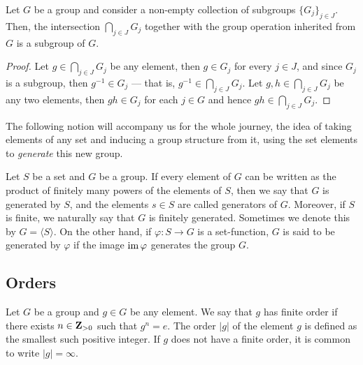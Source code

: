 \begin{corollary}
    \label{cor:intersection-subgroups}
    Let \(G\) be a group and consider a non-empty collection of subgroups
    \(\{G_{j}\}_{j \in J}\). Then, the intersection \(\bigcap_{j \in J} G_j\) together with
    the group operation inherited from \(G\) is a subgroup of \(G\).
\end{corollary}

\begin{proof}
    Let \(g \in \bigcap_{j \in J} G_j\) be any element, then \(g \in G_j\) for every
    \(j \in J\), and since \(G_j\) is a subgroup, then \(g^{-1} \in G_j\) --- that
    is, \(g^{-1} \in \bigcap_{j \in J} G_j\). Let \(g, h \in \bigcap_{j \in J} G_j\) be
    any two elements, then \(gh \in G_j\) for each \(j \in G\) and hence \(g h \in
    \bigcap_{j \in J} G_j\).
\end{proof}

The following notion will accompany us for the whole journey, the idea of taking
elements of any set and inducing a group structure from it, using the set
elements to \emph{generate} this new group.


\begin{definition}
    \label{def:group-generated}
    Let \(S\) be a set and \(G\) be a group. If every element of \(G\) can be
    written as the product of finitely many powers of the elements of \(S\), then we
    say that \(G\) is generated by \(S\), and the elements \(s \in S\) are called
    generators of \(G\). Moreover, if \(S\) is finite, we naturally say that \(G\)
    is finitely generated. Sometimes we denote this by \(G = \langle S \rangle\).
    On the other hand, if \(\varphi: S \to G\) is a set-function, \(G\) is said to
    be generated by \(\varphi\) if the image \(\operatorname{im} \varphi\) generates the group
    \(G\).
\end{definition}

\subsection{Orders}

\begin{definition}\label{def: group elem order}
    Let \(G\) be a group and \(g \in G\) be any element. We say that \(g\) has
    finite order if there exists \(n \in \mathbf{Z}_{> 0}\) such that \(g^n = e\).
    The order \(|g|\) of the element \(g\) is defined as the smallest such
    positive integer. If \(g\) does not have a finite order, it is common to write
    \(|g| = \infty\).
\end{definition}

